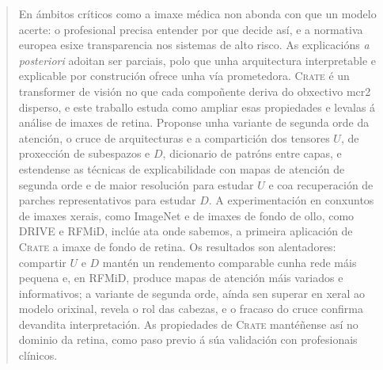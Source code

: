 
\pagestyle{empty}
\begin{abstract}
				En ámbitos críticos como a imaxe médica non abonda con que un modelo acerte: o profesional precisa entender por que decide así, e a normativa europea esixe transparencia nos sistemas de alto risco. As explicacións \emph{a posteriori} adoitan ser parciais, polo que unha arquitectura interpretable e explicable por construción ofrece unha vía prometedora. \textsc{Crate} é un transformer de visión no que cada compoñente deriva do obxectivo \acrfull{mcr2} disperso, e este traballo estuda como ampliar esas propiedades e levalas á análise de imaxes de retina. Proponse unha variante de segunda orde da atención, o cruce de arquitecturas e a compartición dos tensores $U$, de proxección de subespazos e $D$, dicionario de patróns entre capas, e estendense as técnicas de explicabilidade con mapas de atención de segunda orde e de maior resolución para estudar $U$ e coa recuperación de parches representativos para estudar $D$. A experimentación en conxuntos de imaxes xerais, como ImageNet e de imaxes de fondo de ollo, como DRIVE e RFMiD, inclúe ata onde sabemos, a primeira aplicación de \textsc{Crate} a imaxe de fondo de retina. Os resultados son alentadores: compartir $U$ e $D$ mantén un rendemento comparable cunha rede máis pequena e, en RFMiD, produce mapas de atención máis variados e informativos; a variante de segunda orde, aínda sen superar en xeral ao modelo orixinal, revela o rol das cabezas, e o fracaso do cruce confirma devandita interpretación. As propiedades de \textsc{Crate} mantéñense así no dominio da retina, como paso previo á súa validación con profesionais clínicos.
  \vspace*{25pt}
  \begin{segundoresumo}

\end{segundoresumo}
\end{abstract}

